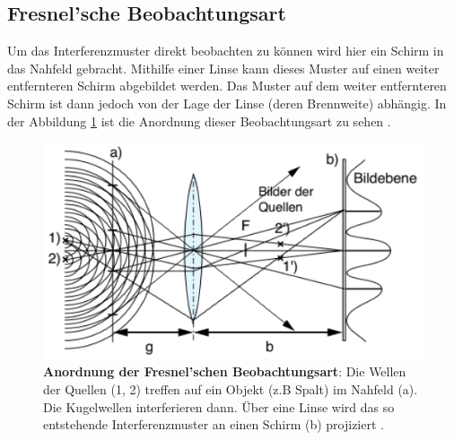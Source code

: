 \subsection{Fresnel'sche Beobachtungsart}
\label{subsec:fresnelBeobachtungsart}
Um das Interferenzmuster direkt beobachten zu können wird hier ein Schirm in das Nahfeld gebracht. Mithilfe einer Linse kann dieses Muster auf einen weiter entfernteren Schirm abgebildet werden. Das Muster auf dem weiter entfernteren Schirm ist dann jedoch von der Lage der Linse (deren Brennweite) abhängig. In der Abbildung \ref{fig:Fresnel} ist die Anordnung dieser Beobachtungsart zu sehen \cite{Angaben2011}.\\[-0.5cm]
\begin{figure}[h]
\begin{center}
\includegraphics[scale=0.8]{Bilder/Fresnel.png} 
\end{center}
\vspace*{-0.5cm}
\caption[Anordnung der Fresnel'schen Beobachtungsart]{\textbf{Anordnung der Fresnel'schen Beobachtungsart}: Die Wellen der Quellen (1, 2) treffen auf ein Objekt (z.B Spalt) im Nahfeld (a). Die Kugelwellen interferieren dann. Über eine Linse wird das so entstehende Interferenzmuster an einen Schirm (b) \glqq projiziert\grqq\; \cite{Angaben2011}.}
\label{fig:Fresnel}
\end{figure}
\newpage

